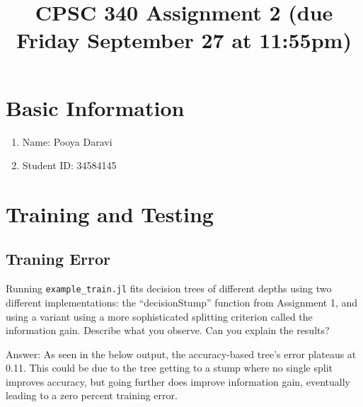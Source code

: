 \documentclass{article}
\def\ans#1{\par\gre{Answer: #1}}
\def\blu#1{{\color{blu}#1}}
\def\gre#1{{\color{gre}#1}}
\def\items#1{\begin{itemize}#1\end{itemize}}
\def\enum#1{\begin{enumerate}#1\end{enumerate}}
\begin{document}
\title{CPSC 340 Assignment 2 (due Friday September 27 at 11:55pm)}
\author{}
\date{}
\maketitle

\vspace{-6em}

\section*{Basic Information}

\blu{\enum{
\item Name: Pooya Daravi
\item Student ID: 34584145
}
}



\section{Training and Testing}

\subsection{Traning Error}

Running \texttt{example\_train.jl} fits decision trees of different depths using two different implementations:
the ``decisionStump'' function from Assignment 1, and using a variant using a more sophisticated splitting criterion called the information gain. \blu{Describe what you observe. Can you explain the results?}

\ans{
    As seen in the below output, the accuracy-based tree's error plateaus at 0.11. This could be due to the tree getting to a stump where no single split improves accuracy, but going further does improve information gain, eventually leading to a zero percent training error.
}
\end{document}
